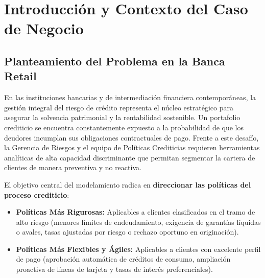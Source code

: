 \documentclass[11pt,a4paper]{article}
\begin{document}
\section{Introducción y Contexto del Caso de Negocio}

\subsection{Planteamiento del Problema en la Banca Retail}
En las instituciones bancarias y de intermediación financiera contemporáneas, la gestión integral del riesgo de crédito representa el núcleo estratégico para asegurar la solvencia patrimonial y la rentabilidad sostenible. Un portafolio crediticio se encuentra constantemente expuesto a la probabilidad de que los deudores incumplan sus obligaciones contractuales de pago. Frente a este desafío, la Gerencia de Riesgos y el equipo de Políticas Crediticias requieren herramientas analíticas de alta capacidad discriminante que permitan segmentar la cartera de clientes de manera preventiva y no reactiva.

El objetivo central del modelamiento radica en \textbf{direccionar las políticas del proceso crediticio}:
\begin{itemize}[leftmargin=1.5cm]
    \item \textbf{Políticas Más Rigurosas:} Aplicables a clientes clasificados en el tramo de alto riesgo (menores límites de endeudamiento, exigencia de garantías líquidas o avales, tasas ajustadas por riesgo o rechazo oportuno en originación).
    \item \textbf{Políticas Más Flexibles y Ágiles:} Aplicables a clientes con excelente perfil de pago (aprobación automática de créditos de consumo, ampliación proactiva de líneas de tarjeta y tasas de interés preferenciales).
\end{itemize}
\end{document}
